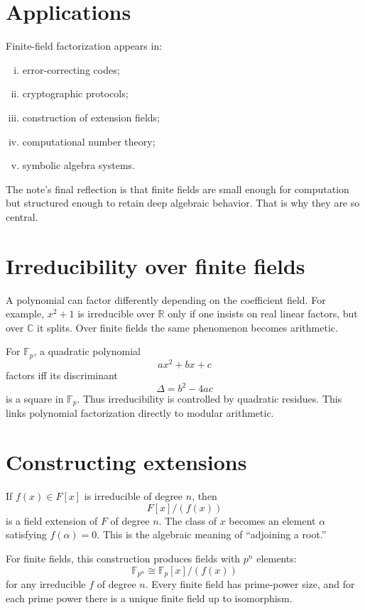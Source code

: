 \section{Applications}

Finite-field factorization appears in:
\begin{enumerate}[(i)]
  \item error-correcting codes;
  \item cryptographic protocols;
  \item construction of extension fields;
  \item computational number theory;
  \item symbolic algebra systems.

\end{enumerate}
The note's final reflection is that finite fields are small enough for computation but structured enough to retain deep algebraic behavior.  That is why they are so central.


\section{Irreducibility over finite fields}

A polynomial can factor differently depending on the coefficient field.  For example, \(x^2+1\) is irreducible over \(\mathbb R\) only if one insists on real linear factors, but over \(\mathbb C\) it splits.  Over finite fields the same phenomenon becomes arithmetic.

For \(\mathbb F_p\), a quadratic polynomial
\[
  ax^2+bx+c
\]
factors iff its discriminant
\[
  \Delta=b^2-4ac
\]
is a square in \(\mathbb F_p\).  Thus irreducibility is controlled by quadratic residues.  This links polynomial factorization directly to modular arithmetic.

\section{Constructing extensions}

If \(f(x)\in F[x]\) is irreducible of degree \(n\), then
\[
  F[x]/(f(x))
\]
is a field extension of \(F\) of degree \(n\).  The class of \(x\) becomes an element \(\alpha\) satisfying \(f(\alpha)=0\).  This is the algebraic meaning of “adjoining a root.”

For finite fields, this construction produces fields with \(p^n\) elements:
\[
  \mathbb F_{p^n}\cong \mathbb F_p[x]/(f(x))
\]
for any irreducible \(f\) of degree \(n\).  Every finite field has prime-power size, and for each prime power there is a unique finite field up to isomorphism.

